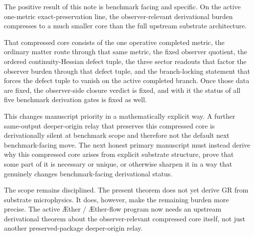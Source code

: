 \documentclass[11pt]{article}
\newcommand{\Aether}{\AE{}ther}
\newcommand{\Aflow}{\AE{}ther-flow}
\begin{document}
The positive result of this note is benchmark facing and specific. On the active one-metric exact-preservation line, the observer-relevant derivational burden compresses to a much smaller core than the full upstream substrate architecture.

That compressed core consists of the one operative completed metric, the ordinary matter route through that same metric, the fixed observer quotient, the ordered continuity-Hessian defect tuple, the three sector readouts that factor the observer burden through that defect tuple, and the branch-locking statement that forces the defect tuple to vanish on the active completed branch. Once those data are fixed, the observer-side closure verdict is fixed, and with it the status of all five benchmark derivation gates is fixed as well.

This changes manuscript priority in a mathematically explicit way. A further same-output deeper-origin relay that preserves this compressed core is derivationally silent at benchmark scope and therefore not the default next benchmark-facing move. The next honest primary manuscript must instead derive why this compressed core arises from explicit substrate structure, prove that some part of it is necessary or unique, or otherwise sharpen it in a way that genuinely changes benchmark-facing derivational status.

The scope remains disciplined. The present theorem does not yet derive GR from substrate microphysics. It does, however, make the remaining burden more precise. The active \Aether{} / \Aflow{} program now needs an upstream derivational theorem about the observer-relevant compressed core itself, not just another preserved-package deeper-origin relay.
\end{document}
